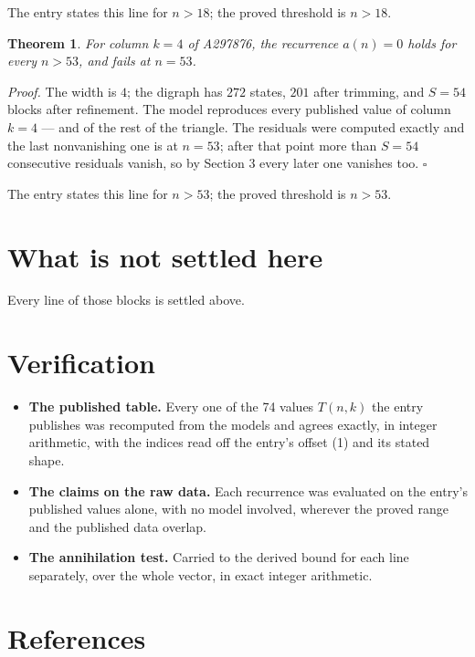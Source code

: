 \documentclass[11pt]{article}
\newtheorem{theorem}{Theorem}
\theoremstyle{definition}
\begin{document}
The entry states this line for $n > 18$; the proved threshold is $n > 18$.

\begin{theorem} For column $k = 4$ of A297876, the recurrence $a(n) = 0$ holds for every $n > 53$, and fails at $n = 53$.\end{theorem}

{\itshape Proof.} The width is $4$; the digraph has $272$ states, $201$ after trimming, and $S = 54$ blocks after refinement. The model reproduces every published value of column $k = 4$ --- and of the rest of the triangle. The residuals were computed exactly and the last nonvanishing one is at $n = 53$; after that point more than $S = 54$ consecutive residuals vanish, so by Section 3 every later one vanishes too. $\square$

The entry states this line for $n > 53$; the proved threshold is $n > 53$.

\section{What is not settled here}

Every line of those blocks is settled above.

\section{Verification}

\begin{itemize}

\item {\bfseries The published table.} Every one of the 74 values $T(n,k)$ the entry publishes was recomputed from the models and agrees exactly, in integer arithmetic, with the indices read off the entry's offset (1) and its stated shape.

\item {\bfseries The claims on the raw data.} Each recurrence was evaluated on the entry's published values alone, with no model involved, wherever the proved range and the published data overlap.

\item {\bfseries The annihilation test.} Carried to the derived bound for each line separately, over the whole vector, in exact integer arithmetic.

\end{itemize}

\section{References}
\end{document}
